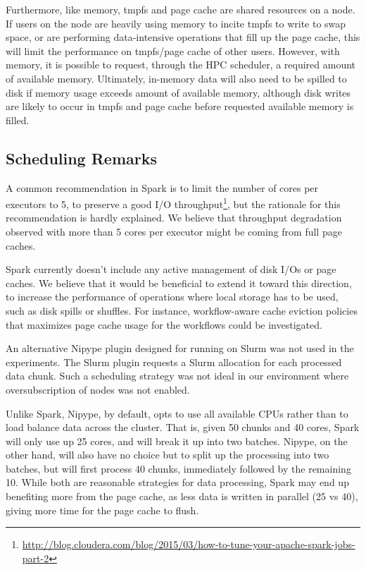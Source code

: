 \documentclass{IEEEtran}
\begin{document}
Furthermore, like memory, tmpfs and page cache are shared resources on a node.
If users on the node are heavily using memory to incite tmpfs to write to swap space, or are performing data-intensive operations
that fill up the page cache, this will limit the performance on tmpfs/page cache of other users. 
However, with memory, it is possible to request, through the HPC scheduler, a required
amount of available memory. Ultimately, in-memory data will also need to be spilled to
disk if memory usage exceeds amount of available memory, although disk writes are 
likely to occur in tmpfs and page cache before requested available memory is filled.

\subsection{Scheduling Remarks}

A common recommendation in Spark is to limit the number of cores per 
executors to 5, to preserve a good I/O 
throughput\footnote{\url{http://blog.cloudera.com/blog/2015/03/how-to-tune-your-apache-spark-jobs-part-2}}, 
but the rationale for this recommendation is hardly explained. We 
believe that throughput degradation observed with more than 5 cores per 
executor might be coming from full page caches.

Spark currently doesn't include any active management of disk I/Os or 
page caches. We believe that it would be beneficial to extend it toward 
this direction, to increase the performance of operations where local 
storage has to be used, such as disk spills or shuffles. For instance, 
workflow-aware cache eviction policies that maximizes page cache usage 
for the workflows could be investigated. 

An alternative Nipype plugin designed for running on Slurm was not used 
in the experiments. The Slurm plugin requests a Slurm allocation for 
each processed data chunk. Such a scheduling strategy was not ideal in 
our environment where oversubscription of nodes was not enabled.

Unlike Spark, Nipype, by default, opts to use all available CPUs rather 
than to load balance data across the cluster. That is, given 50 chunks 
and 40 cores, Spark will only use up 25 cores, and will break it up 
into two batches. Nipype, on the other hand, will also have no choice 
but to split up the processing into two batches, but will first process 
40 chunks, immediately followed by the remaining 10. While both are 
reasonable strategies for data processing, Spark may end up benefiting 
more from the page cache, as less data is written in parallel (25 vs 
40), giving more time for the page cache to flush.
\end{document}
